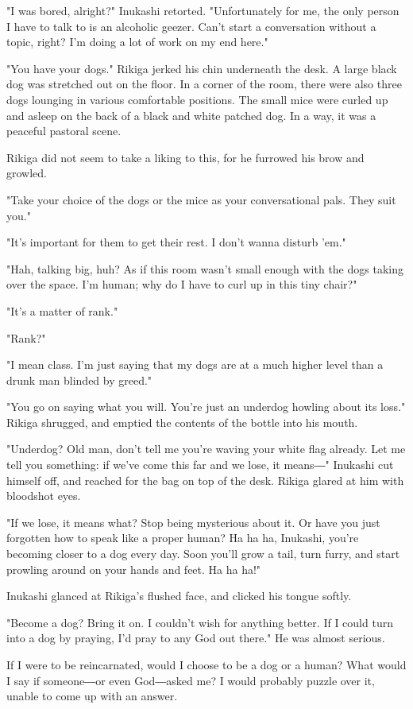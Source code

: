 "I was bored, alright?" Inukashi retorted. "Unfortunately for me, the
only person I have to talk to is an alcoholic geezer. Can't start a
conversation without a topic, right? I'm doing a lot of work on my end
here."

"You have your dogs." Rikiga jerked his chin underneath the desk. A
large black dog was stretched out on the floor. In a corner of the room,
there were also three dogs lounging in various comfortable positions.
The small mice were curled up and asleep on the back of a black and
white patched dog. In a way, it was a peaceful pastoral scene.

Rikiga did not seem to take a liking to this, for he furrowed his brow
and growled.

"Take your choice of the dogs or the mice as your conversational pals.
They suit you."

"It's important for them to get their rest. I don't wanna disturb 'em."

"Hah, talking big, huh? As if this room wasn't small enough with the
dogs taking over the space. I'm human; why do I have to curl up in this
tiny chair?"

"It's a matter of rank."

"Rank?"

"I mean class. I'm just saying that my dogs are at a much higher level
than a drunk man blinded by greed."

"You go on saying what you will. You're just an underdog howling about
its loss." Rikiga shrugged, and emptied the contents of the bottle into
his mouth.

"Underdog? Old man, don't tell me you're waving your white flag already.
Let me tell you something: if we've come this far and we lose, it
means―" Inukashi cut himself off, and reached for the bag on top of the
desk. Rikiga glared at him with bloodshot eyes.

"If we lose, it means what? Stop being mysterious about it. Or have you
just forgotten how to speak like a proper human? Ha ha ha, Inukashi,
you're becoming closer to a dog every day. Soon you'll grow a tail, turn
furry, and start prowling around on your hands and feet. Ha ha ha!"

Inukashi glanced at Rikiga's flushed face, and clicked his tongue
softly.

"Become a dog? Bring it on. I couldn't wish for anything better. If I
could turn into a dog by praying, I'd pray to any God out there." He was
almost serious.

If I were to be reincarnated, would I choose to be a dog or a human?
What would I say if someone―or even God―asked me? I would probably
puzzle over it, unable to come up with an answer.

